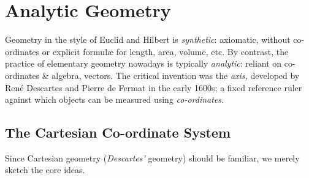 \graphicspath{{3analytic/asy/}}

\section{Analytic Geometry}

Geometry in the style of Euclid and Hilbert is \emph{synthetic}: axiomatic, without co-ordinates or explicit formulæ for length, area, volume, etc. By contrast, the practice of elementary geometry nowadays is typically \emph{analytic}: reliant on co-ordinates \& algebra, vectors. The critical invention was the \emph{axis,} developed by René Descartes and Pierre de Fermat in the early 1600s; a fixed reference ruler against which objects can be measured using \emph{co-ordinates.}

\subsection{The Cartesian Co-ordinate System}

Since Cartesian geometry (\emph{Descartes'} geometry) should be familiar, we merely sketch the core ideas.


